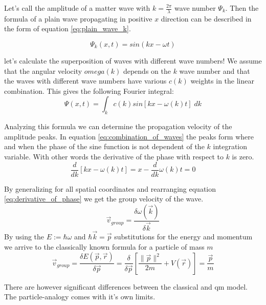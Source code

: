 Let's call the amplitude of a matter wave with $k=\frac{2\pi}{\lambda}$ wave number $\Psi_k$. Then the formula of a plain wave propagating in positive $x$ direction can be described in the form of equation \ref{eq:plain_wave_k}.

\begin{equation}
	\label{eq:plain_wave_k}
	\Psi_k(x, t) = sin(kx - \omega t)
\end{equation}

let's calculate the superposition of waves with different wave numbers! We assume that the angular velocity $omega(k)$ depends on the $k$ wave number and that the waves with different wave numbers have various $c(k)$ weights in the linear combination. This gives the following Fourier integral:
\begin{equation}
	\label{eq:combination_of_waves}
	\Psi(x, t) = \int_k c(k) sin[kx - \omega(k)t]\; dk
\end{equation}

Analyzing this formula we can determine the propagation velocity of the amplitude peaks.
In equation \ref{eq:combination_of_waves} the peaks form where and when the phase of the sine function is not dependent of the $k$ integration variable. With other words the derivative of the phase with respect to $k$ is zero.
\begin{equation}
	\label{eq:derivative_of_phase}
	\frac{d}{dk}[kx - \omega(k)t] = x - \frac{d}{dk}\omega(k)t = 0
\end{equation}

By generalizing for all spatial coordinates and rearranging equation \ref{eq:derivative_of_phase} we get the group velocity of the wave.
\begin{equation}
	\label{eq:group_velocity}
	\vec{v}_{group} = \frac{\delta \omega(\vec{k})}{\delta \vec{k}}
\end{equation}
By using the $E := \hbar \omega$ and $\hbar \vec{k} = \vec{p}$ substitutions for the energy and momentum we arrive to the classically known formula for a particle of mass $m$
\begin{equation}
	\label{eq:classical_group_velocity}
	\vec{v}_{group} = \frac{\delta E(\vec{p}, \vec{r})}{\delta\vec{p}} = \frac{\delta}{\delta\vec{p}}\left[ \frac{\|\vec{p}\|^2}{2m} + V(\vec{r}) \right] = \frac{\vec{p}}{m}
\end{equation}

There are however significant differences between the classical and \acrshort{qm} model.
The particle-analogy comes with it's own limits.


